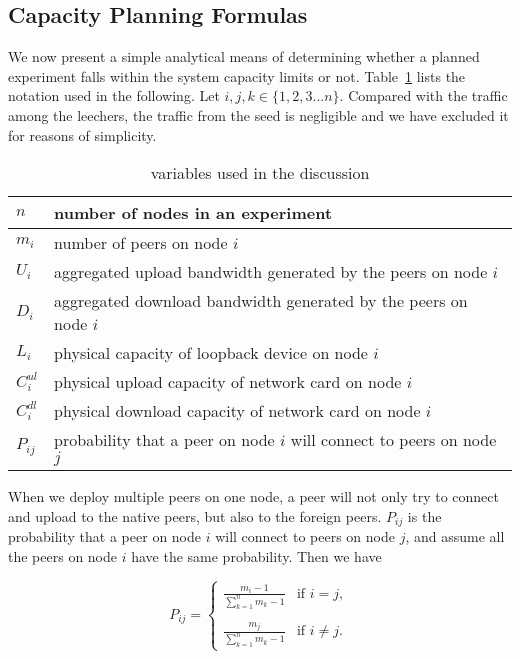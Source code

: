 \documentclass[10pt,letterpaper,twocolumn]{article}
\begin{document}
\subsection{Capacity Planning Formulas}
\label{sec:capac-plann-form}

We now present a simple analytical means of determining whether a
planned experiment falls within the system capacity limits or not.
Table~\ref{tab:table_cpvar} lists the notation used in the
following. Let $i, j, k\in\lbrace1,2,3...n \rbrace$. Compared with the
traffic among the leechers, the traffic from the seed is negligible
and we have excluded it for reasons of simplicity.

\begin{table}[!tb]
\renewcommand{\arraystretch}{1.0}
\centering
\begin{tabular}{|l|p{5.5cm}|}
\hline
$n$ &  number of nodes in an experiment\\
\hline
$m_i$ & number of peers on node $i$\\
\hline
$U_i$ &  aggregated upload bandwidth generated by the peers on node $i$\\
\hline
$D_i$ &  aggregated download bandwidth generated by the peers on node $i$\\
\hline
$L_i$ & physical capacity of loopback device on node $i$\\
\hline
$C^{ul}_i$ & physical upload capacity of network card on node $i$\\
\hline
$C^{dl}_i$ & physical download capacity of network card on node $i$\\
\hline
$P_{ij}$ &  probability that a peer on node $i$ will connect to peers on node $j$ \\
\hline
\end{tabular}
\caption{variables used in the discussion}
\label{tab:table_cpvar}
\end{table}

When we deploy multiple peers on one node, a peer will not only try to
connect and upload to the native peers, but also to the foreign
peers. $P_{ij}$ is the probability that a peer on node $i$ will
connect to peers on node $j$, and assume all the peers on node $i$
have the same probability. Then we have

\begin{equation}
P_{ij} = \left\{
\begin{array}
{rl}
\frac{m_{i} - 1}{\sum_{k=1}^{n} m_k - 1 } & \text{if } i = j ,\\\\
\frac{m_j}{\sum_{k=1}^{n} m_k - 1} & \text{if } i \neq j .
\end{array}
\right. 
\end{equation}
\end{document}
